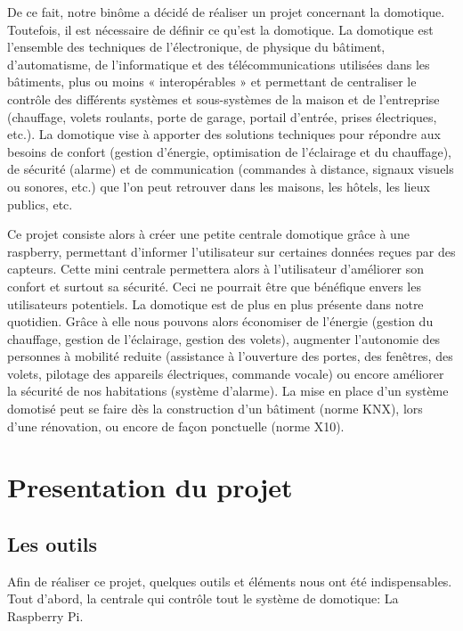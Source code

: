De ce fait, notre binôme a décidé de réaliser un projet concernant la domotique. Toutefois, il est nécessaire de définir ce qu'est la domotique. La domotique est l'ensemble des techniques de l'électronique, de physique du bâtiment, d'automatisme, de l'informatique et des télécommunications utilisées dans les bâtiments, plus ou moins « interopérables » et permettant de centraliser le contrôle des différents systèmes et sous-systèmes de la maison et de l'entreprise (chauffage, volets roulants, porte de garage, 
portail d'entrée, prises électriques, etc.). La domotique vise à apporter des solutions techniques pour répondre aux besoins de 
confort (gestion d'énergie, optimisation de l'éclairage et du chauffage), de sécurité (alarme) et de communication (commandes à 
distance, signaux visuels ou sonores, etc.) que l'on peut retrouver dans les maisons, les hôtels, les lieux publics, etc.


Ce projet consiste alors à créer une petite centrale domotique grâce à une raspberry, permettant d'informer l'utilisateur sur certaines données reçues par des capteurs. Cette mini centrale permettera alors à l'utilisateur d'améliorer son confort et surtout sa sécurité. Ceci ne pourrait être que bénéfique envers les utilisateurs potentiels. La domotique est de plus en plus présente dans notre quotidien. Grâce à elle nous pouvons alors économiser de l'énergie (gestion du chauffage, gestion de l'éclairage, gestion des volets), augmenter l'autonomie des personnes à mobilité reduite (assistance à l'ouverture des portes, des fenêtres, des volets, pilotage des appareils électriques, commande vocale) ou encore améliorer la sécurité de nos habitations (système d'alarme). La mise en place d'un système domotisé peut se faire dès la construction d'un bâtiment (norme KNX), lors d'une rénovation, ou encore de façon ponctuelle (norme X10).





\newpage
\clearpage
\chapter{Presentation du projet}
\section{Les outils} 
Afin de réaliser ce projet, quelques outils et éléments nous ont été indispensables. Tout d'abord, la centrale qui contrôle tout le système de domotique: La Raspberry Pi.

